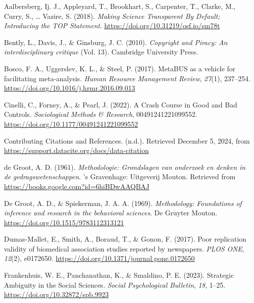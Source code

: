 \documentclass[
  man,floatsintext]{apa6}
\newlength{\cslhangindent}
\newenvironment{CSLReferences}[2] %
 {\begin{list}{}{%
  \setlength{\itemindent}{0pt}
  \setlength{\leftmargin}{0pt}
  \setlength{\parsep}{0pt}
  \ifodd #1
   \setlength{\leftmargin}{\cslhangindent}
   \setlength{\itemindent}{-1\cslhangindent}
  \fi
  \setlength{\itemsep}{#2\baselineskip}}}
 {\end{list}}
\begin{document}
\label{refs}
\begin{CSLReferences}{1}{0}
Aalbersberg, Ij. J., Appleyard, T., Brookhart, S., Carpenter, T., Clarke, M., Curry, S., \ldots{} Vazire, S. (2018). \emph{Making {Science Transparent By Default}; {Introducing} the {TOP Statement}}. \url{https://doi.org/10.31219/osf.io/sm78t}

Bently, L., Davis, J., \& Ginsburg, J. C. (2010). \emph{Copyright and {Piracy}: {An} interdisciplinary critique} (Vol. 13). Cambridge University Press.

Bosco, F. A., Uggerslev, K. L., \& Steel, P. (2017). {MetaBUS} as a vehicle for facilitating meta-analysis. \emph{Human Resource Management Review}, \emph{27}(1), 237--254. \url{https://doi.org/10.1016/j.hrmr.2016.09.013}

Cinelli, C., Forney, A., \& Pearl, J. (2022). A {Crash Course} in {Good} and {Bad Controls}. \emph{Sociological Methods \& Research}, 00491241221099552. \url{https://doi.org/10.1177/00491241221099552}

Contributing {Citations} and {References}. (n.d.). Retrieved December 5, 2024, from \url{https://support.datacite.org/docs/data-citation}

de Groot, A. D. (1961). \emph{Methodologie: Grondslagen van onderzoek en denken in de gedragswetenschappen}. 's Gravenhage: Uitgeverij Mouton. Retrieved from \url{https://books.google.com?id=6hiBDwAAQBAJ}

De Groot, A. D., \& Spiekerman, J. A. A. (1969). \emph{Methodology: {Foundations} of inference and research in the behavioral sciences}. De Gruyter Mouton. \url{https://doi.org/10.1515/9783112313121}

Dumas-Mallet, E., Smith, A., Boraud, T., \& Gonon, F. (2017). Poor replication validity of biomedical association studies reported by newspapers. \emph{PLOS ONE}, \emph{12}(2), e0172650. \url{https://doi.org/10.1371/journal.pone.0172650}

Frankenhuis, W. E., Panchanathan, K., \& Smaldino, P. E. (2023). Strategic {Ambiguity} in the {Social Sciences}. \emph{Social Psychological Bulletin}, \emph{18}, 1--25. \url{https://doi.org/10.32872/spb.9923}


\end{CSLReferences}
\end{document}
